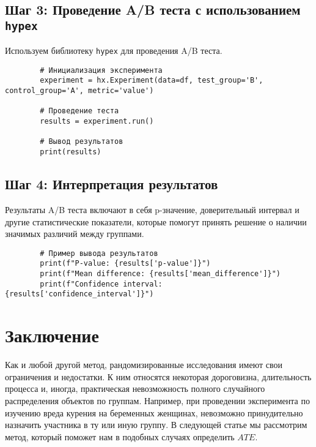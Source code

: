         \subsection{Шаг 3: Проведение A/B теста с использованием \texttt{hypex}}

        Используем библиотеку \texttt{hypex} для проведения A/B теста.

        \begin{verbatim}
        # Инициализация эксперимента
        experiment = hx.Experiment(data=df, test_group='B', control_group='A', metric='value')

        # Проведение теста
        results = experiment.run()

        # Вывод результатов
        print(results)
        \end{verbatim}

        \subsection{Шаг 4: Интерпретация результатов}

        Результаты A/B теста включают в себя p-значение, доверительный интервал и другие статистические показатели, которые помогут принять решение о наличии значимых различий между группами.

        \begin{verbatim}
        # Пример вывода результатов
        print(f"P-value: {results['p-value']}")
        print(f"Mean difference: {results['mean_difference']}")
        print(f"Confidence interval: {results['confidence_interval']}")
        \end{verbatim}

%


    \section*{Заключение}
        Как и любой другой метод, рандомизированные исследования имеют свои ограничения и недостатки.
        К ним относятся некоторая дороговизна, длительность процесса и, иногда, практическая невозможность полного случайного распределения объектов по группам.
        Например, при проведении эксперимента по изучению вреда курения на беременных женщинах, невозможно принудительно назначить участника в ту или иную группу.
        В следующей статье мы рассмотрим метод, который поможет нам в подобных случаях определить $ATE$.



